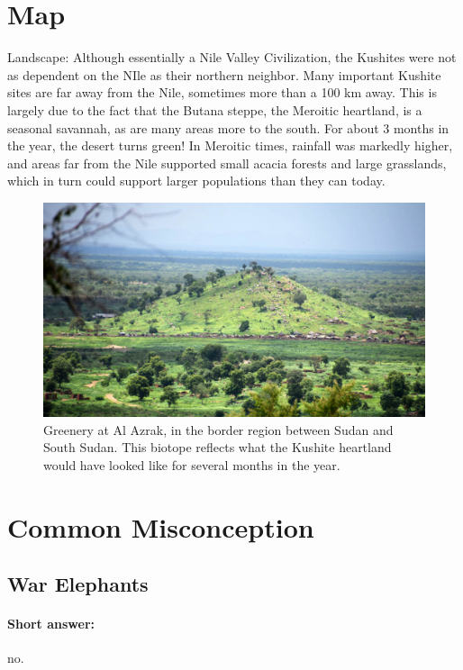 \documentclass[a4paper,12pt]{scrreprt}
\begin{document}
\section{Map}

Landscape: Although essentially a Nile Valley Civilization, the Kushites were not as dependent on the NIle as their northern neighbor. Many important Kushite sites are far away from the Nile, sometimes more than a 100 km away. This is largely due to the fact that the Butana steppe, the Meroitic heartland, is a seasonal savannah, as are many areas more to the south. For about 3 months in the year, the desert turns green! In Meroitic times, rainfall was markedly higher, and areas far from the Nile supported small acacia forests and large grasslands, which in turn could support larger populations than they can today.  

\begin{figure}[H]
	\centering
	\includegraphics[width=\textwidth]{img/greenery_al_azrak}
	\caption{Greenery at Al Azrak, in the border region between Sudan and South Sudan. This biotope reflects what the Kushite heartland would have looked like for several months in the year.}
\end{figure}

\section{Common Misconception}

\subsection{War Elephants}

\paragraph{Short answer:} no.
\end{document}
